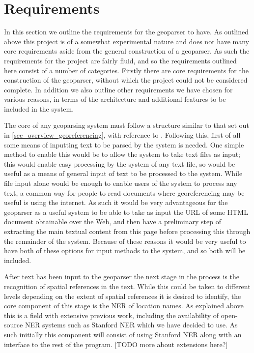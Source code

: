 \documentclass[12pt, a4paper]{report}
\begin{document}
\section{Requirements}

In this section we outline the requirements for the geoparser to have. As outlined above this project is of a somewhat experimental nature and does not have many core requirements aside from the general construction of a geoparser. As such the requirements for the project are fairly fluid, and so the requirements outlined here consist of a number of categories. Firstly there are core requirements for the construction of the geoparser, without which the project could not be considered complete. In addition we also outline other requirements we have chosen for various reasons, in terms of the architecture and additional features to be included in the system.


The core of any geoparsing system must follow a structure similar to that set out in \ref{sec_overview_georeferencing}, with reference to \citet{hill2006}. Following this, first of all some means of inputting text to be parsed by the system is needed. One simple method to enable this would be to allow the system to take text files as input; this would enable easy processing by the system of any text file, so would be useful as a means of general input of text to be processed to the system. While file input alone would be enough to enable users of the system to process any text, a common way for people to read documents where georeferencing may be useful is using the internet. As such it would be very advantageous for the geoparser as a useful system to be able to take as input the URL of some HTML document obtainable over the Web, and then have a preliminary step of extracting the main textual content from this page before processing this through the remainder of the system. Because of these reasons it would be very useful to have both of these options for input methods to the system, and so both will be included.

After text has been input to the geoparser the next stage in the process is the recognition of spatial references in the text. While this could be taken to different levels depending on the extent of spatial references it is desired to identify, the core component of this stage is the NER of location names. As explained above this is a field with extensive previous work, including the availability of open-source NER systems such as Stanford NER which we have decided to use. As such initially this component will consist of using Stanford NER along with an interface to the rest of the program. [TODO more about extensions here?]
\end{document}
